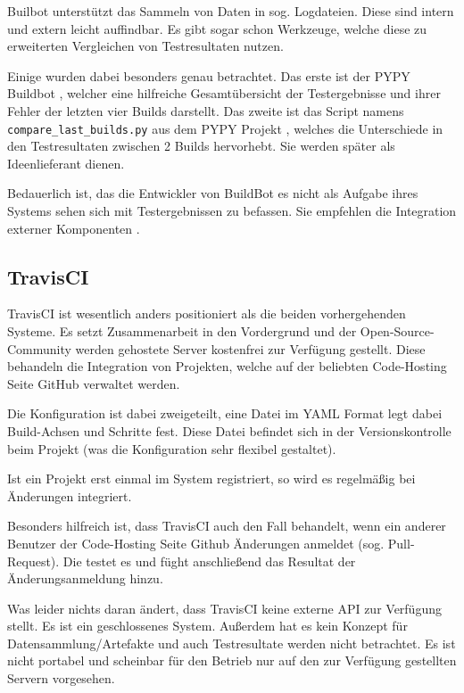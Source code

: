 Builbot unterst\"utzt das Sammeln von Daten in sog. Logdateien.
Diese sind intern und extern leicht auffindbar.
Es gibt sogar schon Werkzeuge, welche diese zu erweiterten Vergleichen von Testresultaten nutzen.

Einige wurden dabei besonders genau betrachtet.
Das erste ist der PYPY Buildbot \cite{pypy:overview}, welcher eine hilfreiche Gesamtübersicht der Testergebnisse und ihrer Fehler
der letzten vier Builds darstellt.
Das zweite ist das Script namens \verb|compare_last_builds.py|
aus dem PYPY Projekt \cite{pypy:diffscript} ,
welches die Unterschiede in den Testresultaten zwischen 2 Builds hervorhebt.
Sie werden sp\"ater als Ideenlieferant dienen.

Bedauerlich ist, das die Entwickler von BuildBot es nicht als Aufgabe ihres Systems sehen
sich mit Testergebnissen zu befassen.
Sie empfehlen die Integration externer Komponenten \cite{buildbot:irc}.

\subsection{TravisCI}


TravisCI \cite{travisci:website} ist wesentlich anders positioniert als die beiden vorhergehenden Systeme.
Es setzt Zusammenarbeit in den Vordergrund und der Open-Source-Community werden gehostete Server
kostenfrei zur Verf\"ugung gestellt.
Diese behandeln die Integration von Projekten,
welche auf der beliebten Code-Hosting Seite GitHub verwaltet werden.

Die Konfiguration ist dabei zweigeteilt,
eine Datei im YAML Format \cite{yaml:website} legt dabei Build-Achsen und Schritte fest.
Diese Datei befindet sich in der Versionskontrolle beim Projekt
(was die Konfiguration sehr flexibel gestaltet).

Ist ein Projekt erst einmal im System registriert,
so wird es regelmäßig bei Änderungen integriert.

Besonders hilfreich ist, dass TravisCI auch den Fall behandelt,
wenn ein anderer Benutzer der Code-Hosting Seite Github \"Anderungen anmeldet
\cite{github:pullreq} (sog. Pull-Request).
Die testet es und f\"ught anschließend das Resultat der \"Anderungsanmeldung hinzu.

Was leider nichts daran \"andert, dass TravisCI keine externe API zur Verfügung stellt.
Es ist ein geschlossenes System. Außerdem hat es kein Konzept f\"ur Datensammlung/Artefakte
und auch Testresultate werden nicht betrachtet.
Es ist nicht portabel und scheinbar f\"ur den Betrieb nur
auf den zur Verfügung gestellten Servern vorgesehen.


